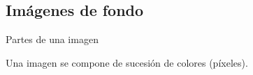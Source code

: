\subsection{Imágenes de fondo}
\begin{frame}{Partes de una imagen}
    \begin{block}{}
        \centering{}Una imagen se compone de sucesión de colores (píxeles).
    \end{block}
    \vfill{}
    \begin{columns}
    \begin{column}{0.25\textwidth}
    \end{column}
    \begin{column}{0.05\textwidth}
    \end{column}
    \begin{column}{0.5\textwidth}
    \end{column}
    \begin{column}{0.05\textwidth}
    \end{column}
    \begin{column}{0.25\textwidth}
    \end{column}
    \end{columns}
\end{frame}

